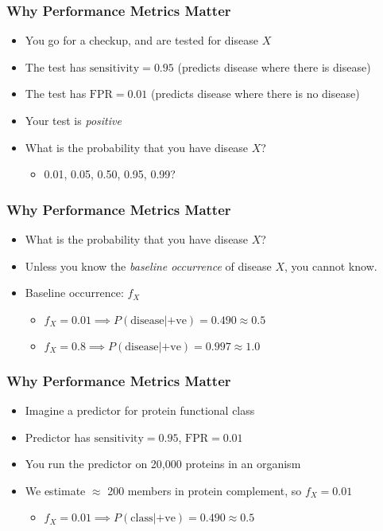 \begin{frame}
  \frametitle{Why Performance Metrics Matter}
  \begin{itemize}
    \item<1-> You go for a checkup, and are tested for disease $X$
    \item<1-> The test has $\text{sensitivity}=0.95$ (predicts disease where there is disease)
    \item<1-> The test has $\text{FPR}=0.01$ (predicts disease where there is no disease)
    \item<2-> Your test is \emph{positive}
    \item<2-> What is the probability that you have disease $X$?
    \begin{itemize}
      \item 0.01, 0.05, 0.50, 0.95, 0.99?
    \end{itemize}
  \end{itemize} 
\end{frame}

\begin{frame}
  \frametitle{Why Performance Metrics Matter}
  \begin{itemize}
    \item<1-> What is the probability that you have disease $X$?
    \item<1-> Unless you know the \emph{baseline occurrence} of disease $X$, you cannot know.
    \item<2-> Baseline occurrence: $f_X$
    \begin{itemize}
      \item $f_X = 0.01 \implies P(\text{disease}|\text{+ve}) = 0.490 \approx 0.5$
      \item $f_X = 0.8 \implies P(\text{disease}|\text{+ve}) = 0.997 \approx 1.0$         
    \end{itemize}
  \end{itemize} 
\end{frame}

\begin{frame}
  \frametitle{Why Performance Metrics Matter}
  \begin{itemize}
    \item<1-> Imagine a predictor for protein functional class
    \item<1-> Predictor has $\text{sensitivity}=0.95$, $\text{FPR}=0.01$
    \item<1-> You run the predictor on 20,000 proteins in an organism
    \item<2-> We estimate $\approx$ 200 members in protein complement, so $f_X=0.01$
    \begin{itemize}
      \item $f_X = 0.01 \implies P(\text{class}|\text{+ve}) = 0.490 \approx 0.5$
    \end{itemize}
  \end{itemize} 
\end{frame}

